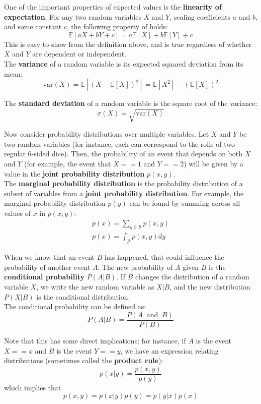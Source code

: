 \documentclass[12pt,letterpaper]{article}
\newcommand{\E}{\mathbb{E}}
\newcommand{\var}{\mathrm{var}}
\begin{document}
\bigskip

\noindent One of the important properties of expected values is the \textbf{linearity of expectation}. For any two random variables $X$ and $Y$, scaling coefficients $a$ and $b$, and some constant $c$, the following property of holds:
$$\E[aX + bY + c] = a\E[X] + b\E[Y] + c$$
This is easy to show from the definition above, and is true regardless of whether $X$ and $Y$ are dependent or independent. \\

\noindent The {\bf{variance}} of a random variable is its expected squared deviation from its mean:
$$\var(X) = \E[ (X - \E[X])^2 ] = \E[X^2] - (\E[X])^2$$ 

\noindent The {\bf{standard deviation}} of a random variable is the square root of the variance:
$$\sigma(X) = \sqrt{\var(X)}$$

\noindent Now consider probability distributions over multiple variables. Let $X$ and $Y$ be two random variables (for instance, each can correspond to the rolls of two regular 6-sided dice). Then, the probability of an event that depends on both $X$ and $Y$ (for example, the event that $X == 1$ and $Y == 2$) will be given by a value in the {\bf{joint probability distribution}} $p(x, y)$. \\

\noindent The {\bf{marginal probability distribution}} is the probability distribution of a subset of variables from a {\bf{joint probability distribution}}. For example, the marginal probability distribution $p(y)$ can be found by summing across all values of $x$ in $p(x, y)$:
\begin{align*}
p(x) = \sum_{y \in \mathcal{Y}} p(x, y) \\
p(x) = \int_{\mathcal{Y}} p(x,y) dy
\end{align*}

\noindent When we know that an event $B$ has happened, that could influence the probability of another event $A$. The new probability of $A$ given $B$ is the {\bf{conditional probability}} $P(A|B)$. If $B$ changes the distribution of a random variable $X$, we write the new random variable as $X|B$, and the new distribution $P(X|B)$ is the conditional distribution. \\

\noindent The conditional probability can be defined as:
$$ P(A | B) = \frac{P(A \;\; \text{and} \;\; B)}{P(B)}$$

\noindent Note that this has some direct implications: for instance, if $A$ is the event $X == x$ and $B$ is the event $Y == y$, we have an expression relating distributions (sometimes called the {\bf{product rule}}):
$$ p(x | y) = \frac{p(x, y)}{p(y)}$$
which implies that
$$ p(x, y) = p(x | y) p(y) = p(y | x) p(x)$$
\end{document}

